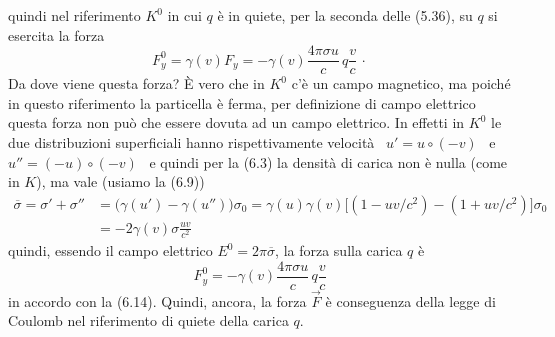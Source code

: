 quindi nel riferimento $K^0$ in cui $q$ \`e in quiete, per la seconda delle
(5.36), su $q$ si esercita la forza
\begin{equation}
  F_y^0=\gamma(v)F_y=-\gamma(v)\frac{4\pi\sigma u}{c}\,q\frac{v}{c}\,\cdot
  \tag{6.14}
\end{equation}
Da dove viene questa forza? \`E vero che in $K^0$ c'\`e un campo magnetico, ma
poich\'e in questo riferimento la particella \`e ferma, per definizione di campo
elettrico questa forza non pu\`o che essere dovuta ad un campo elettrico. In
effetti in $K^0$ le due distribuzioni superficiali hanno rispettivamente
velocit\`a \ $u'=u\circ(-v)$ \ e \ $u''=(-u)\circ(-v)$ \ e quindi per la (6.3)
la densit\`a di carica non \`e nulla (come in $K$), ma vale \big(usiamo la
(6.9)\big)
\begin{equation}
  \begin{aligned}
    \overline\sigma=\sigma'+\sigma''&=\big(\gamma(u')-\gamma(u'')\big)\sigma_0
    =\gamma(u)\gamma(v)\big[(1-uv/c^2)-(1+uv/c^2)\big]\sigma_0\\
    &=-2\gamma(v)\sigma\frac{uv}{c^2}
  \end{aligned}
  \tag{6.15}
\end{equation}
quindi, essendo il campo elettrico $E^0=2\pi\overline\sigma$, la forza sulla
carica $q$ \`e
\begin{equation}
  F_y^0=-\gamma(v)\frac{4\pi\sigma u}{c}\,q\frac{v}{c}
  \tag{6.16}
\end{equation}
in accordo con la (6.14). Quindi, ancora, la forza $\vec F$ \`e conseguenza
della legge di Coulomb nel riferimento di quiete della carica $q$.

